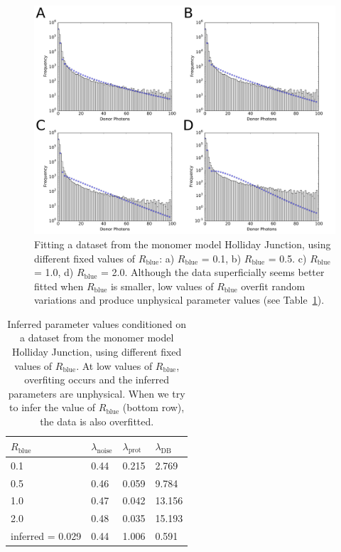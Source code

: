 \begin{figure}
   \begin{center}
      \includegraphics*[clip=true, width=6in]{sizing/vary_Rblue.pdf}
      \caption{Fitting a dataset from the monomer model Holliday Junction, using different fixed values of $R_{\text{blue}}$: a) $R_{\text{blue}}$ = 0.1, b) $R_{\text{blue}}$ = 0.5. c) $R_{\text{blue}}$ = 1.0, d) $R_{\text{blue}}$ = 2.0. Although the data superficially seems better fitted when $R_{\text{blue}}$ is smaller, low values of $R_{\text{blue}}$ overfit random variations and produce unphysical parameter values (see Table~\ref{tab:R_blue}).} 
      \label{fig:vary_Rblue}
   \end{center}
\end{figure}

\begin{center}
\begin{table}
\caption{Inferred parameter values conditioned on a dataset from the monomer model Holliday Junction, using different fixed values of $R_{\text{blue}}$. At low values of $R_{\text{blue}}$, overfiting occurs and the inferred parameters are unphysical. When we try to infer the value of $R_{\text{blue}}$ (bottom row), the data is also overfitted.}
\begin{tabular}{|l|l|l|l|}
\hline
{\bf $R_{\text{blue}}$} & {\bf $\lambda_{\text{noise}}$} & {\bf $\lambda_{\text{prot}}$} & {\bf $\lambda_{\text{DB}}$}\\ \hline
0.1 & 0.44 & 0.215 & 2.769 \\
0.5 & 0.46 & 0.059 & 9.784 \\
1.0 & 0.47 & 0.042 & 13.156 \\
2.0 & 0.48	& 0.035	& 15.193 \\
inferred = 0.029 & 0.44 & 1.006 & 0.591\\ \hline
\end{tabular}
\label{tab:R_blue}
\end{table}
\end{center}

